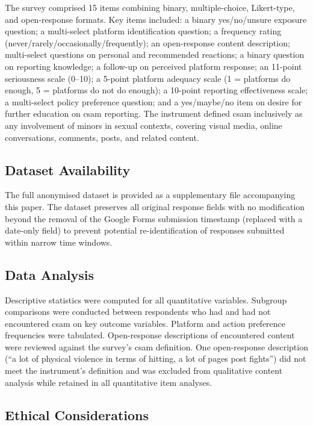 \documentclass{ieee-portfolio}
\begin{document}
The survey comprised 15 items combining binary, multiple-choice, Likert-type, and open-response formats. Key items included: a binary yes/no/unsure exposure question; a multi-select platform identification question; a frequency rating (never/rarely/occasionally/frequently); an open-response content description; multi-select questions on personal and recommended reactions; a binary question on reporting knowledge; a follow-up on perceived platform response; an 11-point seriousness scale (0--10); a 5-point platform adequacy scale (1 = platforms do enough, 5 = platforms do not do enough); a 10-point reporting effectiveness scale; a multi-select policy preference question; and a yes/maybe/no item on desire for further education on \gls{csam} reporting. The instrument defined \gls{csam} inclusively as any involvement of minors in sexual contexts, covering visual media, online conversations, comments, posts, and related content.
 
\subsection{Dataset Availability}
 
The full anonymised dataset is provided as a supplementary file accompanying this paper. The dataset preserves all original response fields with no modification beyond the removal of the Google Forms submission timestamp (replaced with a date-only field) to prevent potential re-identification of responses submitted within narrow time windows.
 
\subsection{Data Analysis}
 
Descriptive statistics were computed for all quantitative variables. Subgroup comparisons were conducted between respondents who had and had not encountered \gls{csam} on key outcome variables. Platform and action preference frequencies were tabulated. Open-response descriptions of encountered content were reviewed against the survey's \gls{csam} definition. One open-response description (``a lot of physical violence in terms of hitting, a lot of pages post fights'') did not meet the instrument's definition and was excluded from qualitative content analysis while retained in all quantitative item analyses.
 
\subsection{Ethical Considerations}
 
\end{document}
